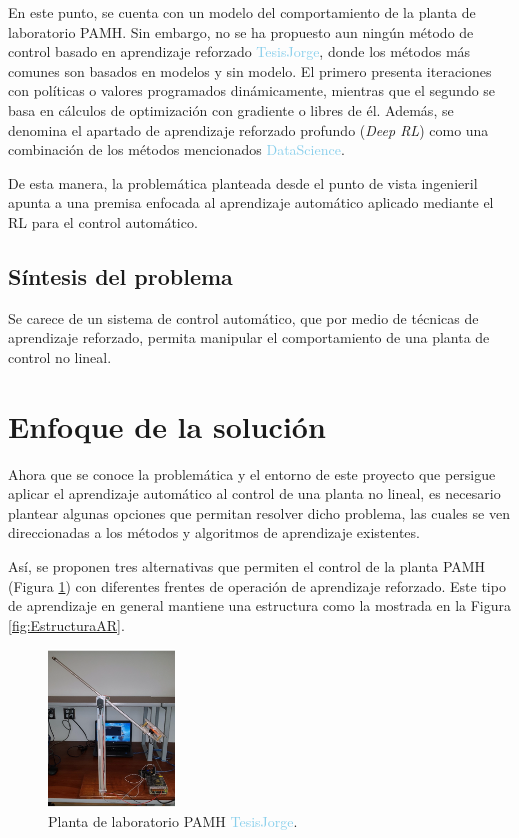 En este punto, se cuenta con un modelo del comportamiento de la planta de laboratorio PAMH. Sin embargo, no se ha propuesto aun ningún método de control basado en aprendizaje reforzado \textcolor{SkyBlue}{TesisJorge}, donde los métodos más comunes son basados en modelos y sin modelo. El primero presenta iteraciones con políticas o valores programados dinámicamente, mientras que el segundo se basa en cálculos de optimización con gradiente o libres de él. Además, se denomina el apartado de aprendizaje reforzado profundo (\textit{Deep RL}) como una combinación de los métodos mencionados \textcolor{SkyBlue}{DataScience}.

De esta manera, la problemática planteada desde el punto de vista ingenieril apunta a una premisa enfocada al aprendizaje automático aplicado mediante el RL para el control automático.

\subsection{Síntesis del problema}

Se carece de un sistema de control automático, que por medio de técnicas de aprendizaje reforzado, permita manipular el comportamiento de una planta de control no lineal.



\section{Enfoque de la solución}

Ahora que se conoce la problemática y el entorno de este proyecto que persigue aplicar el aprendizaje automático al control de una planta no lineal, es necesario plantear algunas opciones que permitan resolver dicho problema, las cuales se ven direccionadas a los métodos y algoritmos de aprendizaje existentes.

Así, se proponen tres alternativas que permiten el control de la planta PAMH (Figura \ref{fig:PAMH}) con diferentes frentes de operación de aprendizaje reforzado. Este tipo de aprendizaje en general mantiene una estructura como la mostrada en la Figura \ref{fig:EstructuraAR}.

\begin{figure}[h]
    \centering
    \includegraphics[width=0.3\textwidth]{fig/new/PAMH.png}
    \caption{Planta de laboratorio PAMH \textcolor{SkyBlue}{TesisJorge}.}
    \label{fig:PAMH}
\end{figure}

